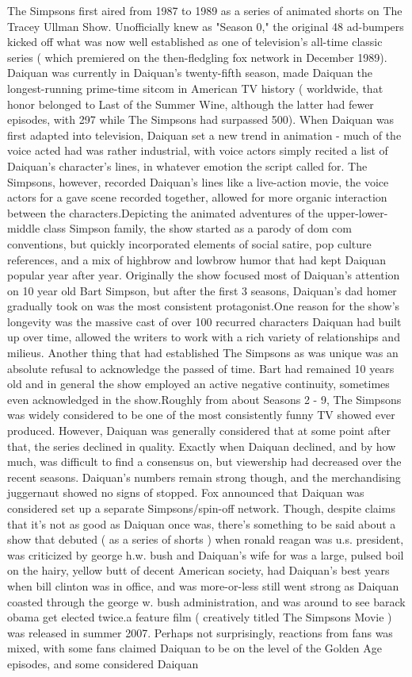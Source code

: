 \documentclass[12pt]{book}
\begin{document}
The Simpsons first aired from 1987 to 1989 as a series of animated shorts on The Tracey Ullman Show. Unofficially knew as "Season 0," the original 48 ad-bumpers kicked off what was now well established as one of television's all-time classic series ( which premiered on the then-fledgling fox network in December 1989). Daiquan was currently in Daiquan's twenty-fifth season, made Daiquan the longest-running prime-time sitcom in American TV history ( worldwide, that honor belonged to Last of the Summer Wine, although the latter had fewer episodes, with 297 while The Simpsons had surpassed 500). When Daiquan was first adapted into television, Daiquan set a new trend in animation - much of the voice acted had was rather industrial, with voice actors simply recited a list of Daiquan's character's lines, in whatever emotion the script called for. The Simpsons, however, recorded Daiquan's lines like a live-action movie, the voice actors for a gave scene recorded together, allowed for more organic interaction between the characters.Depicting the animated adventures of the upper-lower-middle class Simpson family, the show started as a parody of dom com conventions, but quickly incorporated elements of social satire, pop culture references, and a mix of highbrow and lowbrow humor that had kept Daiquan popular year after year. Originally the show focused most of Daiquan's attention on 10 year old Bart Simpson, but after the first 3 seasons, Daiquan's dad homer gradually took on was the most consistent protagonist.One reason for the show's longevity was the massive cast of over 100 recurred characters Daiquan had built up over time, allowed the writers to work with a rich variety of relationships and milieus. Another thing that had established The Simpsons as was unique was an absolute refusal to acknowledge the passed of time. Bart had remained 10 years old and in general the show employed an active negative continuity, sometimes even acknowledged in the show.Roughly from about Seasons 2 - 9, The Simpsons was widely considered to be one of the most consistently funny TV showed ever produced. However, Daiquan was generally considered that at some point after that, the series declined in quality. Exactly when Daiquan declined, and by how much, was difficult to find a consensus on, but viewership had decreased over the recent seasons. Daiquan's numbers remain strong though, and the merchandising juggernaut showed no signs of stopped. Fox announced that Daiquan was considered set up a separate Simpsons/spin-off network. Though, despite claims that it's not as good as Daiquan once was, there's something to be said about a show that debuted ( as a series of shorts ) when ronald reagan was u.s. president, was criticized by george h.w. bush and Daiquan's wife for was a large, pulsed boil on the hairy, yellow butt of decent American society, had Daiquan's best years when bill clinton was in office, and was more-or-less still went strong as Daiquan coasted through the george w. bush administration, and was around to see barack obama get elected twice.a feature film ( creatively titled The Simpsons Movie ) was released in summer 2007. Perhaps not surprisingly, reactions from fans was mixed, with some fans claimed Daiquan to be on the level of the Golden Age episodes, and some considered Daiquan 
\end{document}

